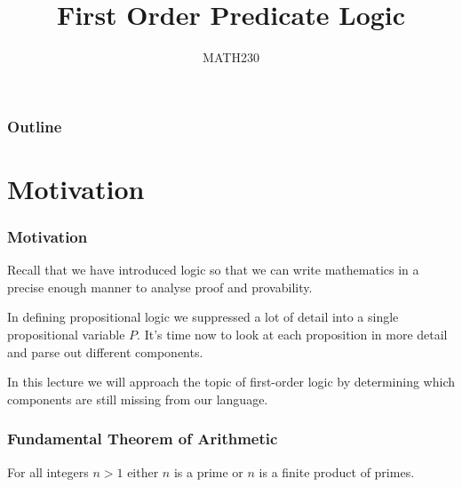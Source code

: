 \documentclass{beamer}
\title{First Order Predicate Logic}
\author{MATH230}
\institute{Te Kura P\=angarau \\ Te Whare W\=ananga o Waitaha}
\date{}
\theoremstyle{indentDefn} \newtheorem{defn}[]{Definition}
\begin{document}
\begin{frame}

  \titlepage

\end{frame}

\begin{frame}
  \frametitle{Outline}

  \tableofcontents

\end{frame}

\section{Motivation}

\begin{frame}
  \frametitle{Motivation}

  Recall that we have introduced logic so that we can write mathematics in a precise enough manner to analyse proof and provability. 
  
  \vspace{5mm}
  
	In defining propositional logic we suppressed a lot of detail into a single propositional variable $P$. It's time now to look at each proposition in more detail and parse out different components. 
  
  \vspace{5mm} 
  
  In this lecture we will approach the topic of first-order logic by determining which components are still missing from our language. 
\end{frame}


\begin{frame}
	\frametitle{Fundamental Theorem of Arithmetic}
	
	For all integers $n > 1$ either $n$ is a prime or $n$ is a finite product of primes. 
	
	\vspace{60mm}
\end{frame}
\end{document}
